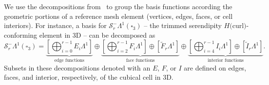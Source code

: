 \documentclass[format=acmsmall,screen,timestamp=false,a4paper]{acmart}
\newcommand{\calS}{\mathcal{S}}
\begin{document}
We use the decompositions from~\cite{gillette2019computational} to group the basis functions according the geometric portions of a reference mesh element (vertices, edges, faces, or cell interiors).  For instance, a basis for $\calS^-_r\Lambda^1(\square_3)$ -- the trimmed serendipity $H($curl$)$-conforming element in 3D -- can be decomposed as
   \begin{equation}\label{eq:HCurlTrimmedSerendipityBasis}
   \calS^-_r\Lambda^1(\square_3) =   \underbrace{\left[\bigoplus_{i=0}^{r-1} E_i \Lambda^1\right]}_{\text{edge functions}}\oplus\underbrace{\left[ \bigoplus_{i=2}^{r-1}F_i \Lambda^1\right] \oplus \left[\tilde{F}_r \Lambda^1\right]}_{\text{face functions}}\oplus\underbrace{\left[ \bigoplus_{i=4}^{r-1}I_i \Lambda^1 \right] \oplus \left[\tilde{I}_r \Lambda^1\right]}_{\text{interior functions}}.
   \end{equation}
  Subsets in these decompositions denoted with an $E$, $F$, or $I$ are defined on edges, faces, and interior, respectively, of the cubical cell in 3D.
  
  
\end{document}
